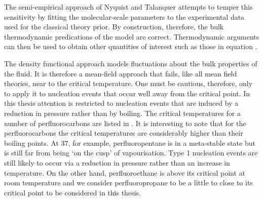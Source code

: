 The semi-empirical approach of Nyquist\cite{Nyquist1995} and Talanquer\cite{Talanquer2001}
attempts to temper this sensitivity by fitting the molecular-scale parameters to the experimental data used for the classical theory prior.
By construction, therefore, the bulk thermodynamic predications of the model are correct.
Thermodynamic arguments can then be used to obtain other quantities of interest such as those in equation \eqnref{}.




The density functional approach models fluctuations about the bulk properties of the fluid.
It is therefore a mean-field approach that fails, like all mean field theories, near to the critical temperature.
One must be cautious, therefore, only to apply it to nucleation events that occur well away from the critical point.
In this thesis  attention is restricted to nucleation events that are induced by a reduction in pressure 
rather than by boiling.
The critical temperatures for a number of perfluorocarbons are listed in .
It is interesting to note that for the perfluorocarbons the critical temperatures are considerably higher than their boiling points.
At \unit{37}\degreecelsius, for example, perfluoropentane is in a meta-stable state but is still far from being `on the cusp' of vapourisation.
Type 1 nucleation events are still likely to occur via a reduction in pressure rather than an increase in temperature.
On the other hand, perfluoroethane is above its  critical point at room temperature and we 
consider perfluoropropane to be a little to close to its  critical point to be considered in this thesis.


